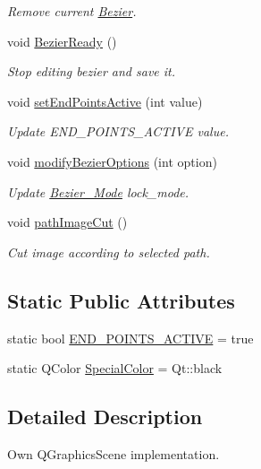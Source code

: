 \begin{DoxyCompactItemize}
\begin{DoxyCompactList}\small\item\em Remove current \mbox{\hyperlink{classBezier}{Bezier}}. \end{DoxyCompactList}\item 
void \mbox{\hyperlink{classOwnGraphicsScene_a0417f4637137fc3ef7004a7b6eeb6a39}{Bezier\+Ready}} ()
\begin{DoxyCompactList}\small\item\em Stop editing bezier and save it. \end{DoxyCompactList}\item 
void \mbox{\hyperlink{classOwnGraphicsScene_a3f4a8a31aa7a9efbf88c4d80c1cbc8ed}{set\+End\+Points\+Active}} (int value)
\begin{DoxyCompactList}\small\item\em Update E\+N\+D\+\_\+\+P\+O\+I\+N\+T\+S\+\_\+\+A\+C\+T\+I\+VE value. \end{DoxyCompactList}\item 
void \mbox{\hyperlink{classOwnGraphicsScene_a302a5f437c44f6fc84f9911e41172734}{modify\+Bezier\+Options}} (int option)
\begin{DoxyCompactList}\small\item\em Update \mbox{\hyperlink{structBezier__Mode}{Bezier\+\_\+\+Mode}} lock\+\_\+mode. \end{DoxyCompactList}\item 
void \mbox{\hyperlink{classOwnGraphicsScene_a0151f87fc7f7597fe91a99a83e261944}{path\+Image\+Cut}} ()
\begin{DoxyCompactList}\small\item\em Cut image according to selected path. \end{DoxyCompactList}\end{DoxyCompactItemize}
\subsection*{Static Public Attributes}
\begin{DoxyCompactItemize}
\item 
static bool \mbox{\hyperlink{classOwnGraphicsScene_a511dd73ffc0a5f3ee28e8950d0636f5e}{E\+N\+D\+\_\+\+P\+O\+I\+N\+T\+S\+\_\+\+A\+C\+T\+I\+VE}} = true
\item 
static Q\+Color \mbox{\hyperlink{classOwnGraphicsScene_af51cea46e8b0cffa341ba88c2b801e81}{Special\+Color}} = Qt\+::black
\end{DoxyCompactItemize}


\subsection{Detailed Description}
Own Q\+Graphics\+Scene implementation. 

